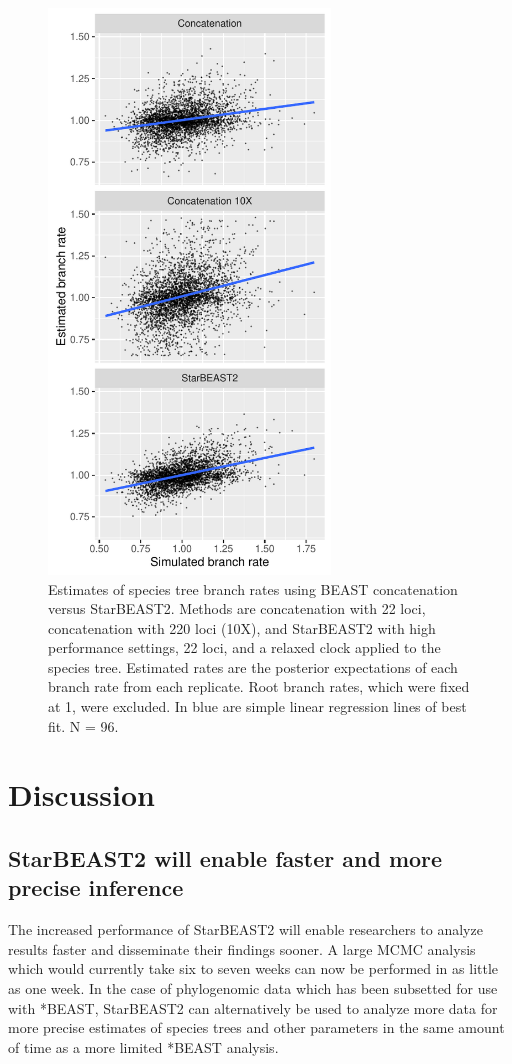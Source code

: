 \documentclass[12pt]{article}
\begin{document}
\begin{figure}[htb!]
\centering
\includegraphics[width=7.5cm]{branch_rates.pdf}
\caption
{Estimates of species tree branch rates using BEAST concatenation versus StarBEAST2.
Methods are concatenation with 22 loci, concatenation with 220 loci (10X), and
StarBEAST2 with high performance settings, 22 loci, and a relaxed clock applied
to the species tree. Estimated rates are the posterior expectations of each
branch rate from each replicate. Root branch rates, which were fixed at 1,
were excluded. In blue are simple linear regression lines of best fit. N = 96.}
\label{fig:branchRates}
\end{figure}

\section{Discussion}

\subsection{StarBEAST2 will enable faster and more precise inference}

The increased performance of StarBEAST2 will enable researchers to analyze
results faster and disseminate their findings sooner. A large MCMC analysis
which would currently take six to seven weeks can now be performed in as little
as one week. In the case of phylogenomic data which has been subsetted for use
with *BEAST, StarBEAST2 can alternatively be used to analyze more data for more
precise estimates of species trees and other parameters in the same amount of
time as a more limited *BEAST analysis.
\end{document}
